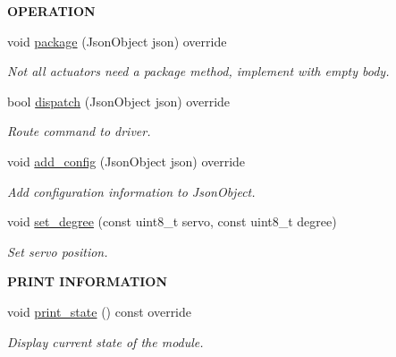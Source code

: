 \begin{Indent}{\bf O\+P\+E\+R\+A\+T\+I\+ON}\par
\begin{DoxyCompactItemize}
\item 
void \hyperlink{class_loom___servo_a0162afa4dade96bb86340fb567b43820}{package} (Json\+Object json) override
\begin{DoxyCompactList}\small\item\em Not all actuators need a package method, implement with empty body. \end{DoxyCompactList}\item 
bool \hyperlink{class_loom___servo_ad24074bb212a1c47ec389379726c7c01}{dispatch} (Json\+Object json) override
\begin{DoxyCompactList}\small\item\em Route command to driver. \end{DoxyCompactList}\item 
void \hyperlink{class_loom___servo_a442e82c30372c4579b3d2bfeeacaccb6}{add\+\_\+config} (Json\+Object json) override
\begin{DoxyCompactList}\small\item\em Add configuration information to Json\+Object. \end{DoxyCompactList}\item 
void \hyperlink{class_loom___servo_a1c03e209fcba106541eaf32fd3eba435}{set\+\_\+degree} (const uint8\+\_\+t servo, const uint8\+\_\+t degree)
\begin{DoxyCompactList}\small\item\em Set servo position. \end{DoxyCompactList}\end{DoxyCompactItemize}
\end{Indent}
\begin{Indent}{\bf P\+R\+I\+NT I\+N\+F\+O\+R\+M\+A\+T\+I\+ON}\par
\begin{DoxyCompactItemize}
\item 
void \hyperlink{class_loom___servo_a8b8f085c570773d5008beccf3467cac6}{print\+\_\+state} () const override
\begin{DoxyCompactList}\small\item\em Display current state of the module. \end{DoxyCompactList}\end{DoxyCompactItemize}
\end{Indent}
